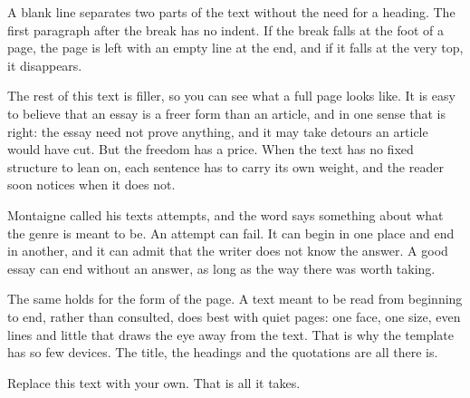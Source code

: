 \documentclass[12pt]{article}
\begin{document}
\textbreak

A blank line separates two parts of the text without the need for a heading. The first paragraph after the break has no indent. If the break falls at the foot of a page, the page is left with an empty line at the end, and if it falls at the very top, it disappears.

The rest of this text is filler, so you can see what a full page looks like. It is easy to believe that an essay is a freer form than an article, and in one sense that is right: the essay need not prove anything, and it may take detours an article would have cut. But the freedom has a price. When the text has no fixed structure to lean on, each sentence has to carry its own weight, and the reader soon notices when it does not.

Montaigne called his texts attempts, and the word says something about what the genre is meant to be. An attempt can fail. It can begin in one place and end in another, and it can admit that the writer does not know the answer. A good essay can end without an answer, as long as the way there was worth taking.

The same holds for the form of the page. A text meant to be read from beginning to end, rather than consulted, does best with quiet pages: one face, one size, even lines and little that draws the eye away from the text. That is why the template has so few devices. The title, the headings and the quotations are all there is.

Replace this text with your own. That is all it takes.
\end{document}
